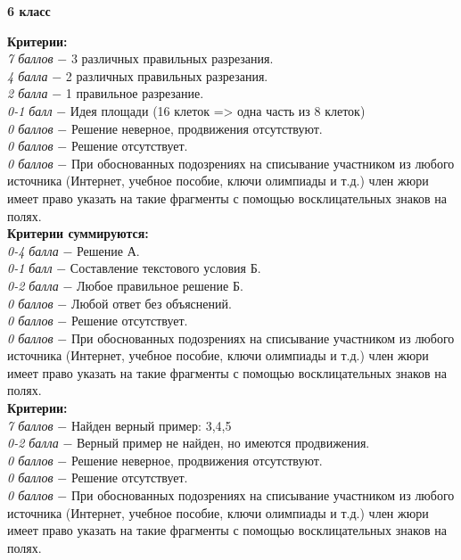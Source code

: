 \centerline{\bf \Huge 6 класс}

 \textbf{Критерии:} \\
\textit{7 баллов} $-$ 3 различных правильных разрезания.\\
\textit{4 балла} $-$ 2 различных правильных разрезания.\\
\textit{2 балла} $-$ 1 правильное разрезание.\\
\textit{0-1 балл} $-$ Идея площади (16 клеток => одна часть из 8 клеток)\\
\textit{0 баллов} $-$ Решение неверное, продвижения отсутствуют.\\
\textit{0 баллов} $-$ Решение отсутствует.\\
\textit{0 баллов} $-$ При обоснованных подозрениях на списывание участником из любого источника (Интернет, учебное пособие, ключи олимпиады и т.д.) член жюри имеет право указать на такие фрагменты с помощью восклицательных знаков на полях. \\

 \textbf{Критерии суммируются:} \\
\textit{0-4 балла} $-$ Решение А.\\
\textit{0-1 балл} $-$ Составление текстового условия Б.\\
\textit{0-2 балла} $-$ Любое правильное решение Б.\\
\textit{0 баллов} $-$ Любой ответ без объяснений.\\
\textit{0 баллов} $-$ Решение отсутствует.\\
\textit{0 баллов} $-$ При обоснованных подозрениях на списывание участником из любого источника (Интернет, учебное пособие, ключи олимпиады и т.д.) член жюри имеет право указать на такие фрагменты с помощью восклицательных знаков на полях. \\


 \textbf{Критерии:} \\
\textit{7 баллов} $-$ Найден верный пример: 3,4,5\\
\textit{0-2 балла} $-$ Верный пример не найден, но имеются продвижения.\\
\textit{0 баллов} $-$ Решение неверное, продвижения отсутствуют.\\
\textit{0 баллов} $-$ Решение отсутствует.\\
\textit{0 баллов} $-$ При обоснованных подозрениях на списывание участником из любого источника (Интернет, учебное пособие, ключи олимпиады и т.д.) член жюри имеет право указать на такие фрагменты с помощью восклицательных знаков на полях. \\


